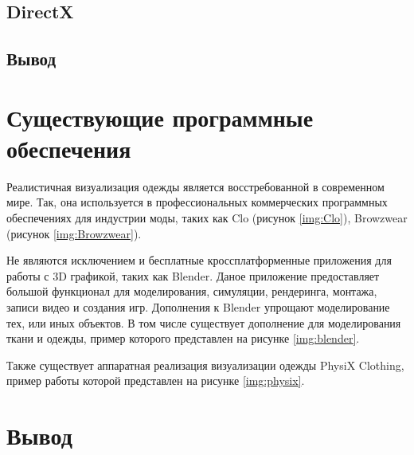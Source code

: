 \subsection{DirectX}

\subsection*{Вывод}

\section{Существующие программные обеспечения}

Реалистичная визуализация одежды является восстребованной в современном мире.
Так, она используется в профессиональных коммерческих программных обеспечениях
для индустрии моды, таких как Clo\cite{site01} (рисунок \ref{img:Clo}),
Browzwear\cite{site02} (рисунок \ref{img:Browzwear}).


Не являются исключением и бесплатные кроссплатформенные приложения для работы с
3D графикой, таких как Blender. Даное приложение предоставляет большой
функционал для моделирования, симуляции, рендеринга, монтажа, записи видео и
создания игр. Дополнения к Blender упрощают моделирование тех, или иных
объектов. В том числе существует дополнение для моделирования ткани и одежды,
пример которого представлен на рисунке \ref{img:blender}.


Также существует аппаратная реализация визуализации одежды PhysiX
Clothing\cite{site03}, пример работы которой представлен на рисунке
\ref{img:physix}.


\section*{Вывод}

